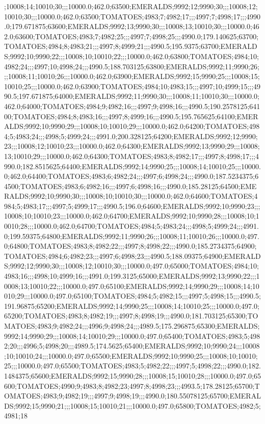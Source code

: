 ;10008;14;10010;30;;;10000.0;462.0;63500;EMERALDS;9992;12;9990;30;;;10008;12;10010;30;;;10000.0;462.0;63500;TOMATOES;4983;7;4982;17;;;4997;7;4998;17;;;4990.0;179.671875;63600;EMERALDS;9992;13;9990;30;;;10008;13;10010;30;;;10000.0;462.0;63600;TOMATOES;4983;7;4982;25;;;4997;7;4998;25;;;4990.0;179.140625;63700;TOMATOES;4984;8;4983;21;;;4997;8;4999;21;;;4990.5;195.9375;63700;EMERALDS;9992;10;9990;22;;;10008;10;10010;22;;;10000.0;462.0;63800;TOMATOES;4984;10;4982;24;;;4997;10;4998;24;;;4990.5;188.703125;63800;EMERALDS;9992;11;9990;26;;;10008;11;10010;26;;;10000.0;462.0;63900;EMERALDS;9992;15;9990;25;;;10008;15;10010;25;;;10000.0;462.0;63900;TOMATOES;4984;10;4983;15;;;4997;10;4999;15;;;4990.5;197.671875;64000;EMERALDS;9992;11;9990;30;;;10008;11;10010;30;;;10000.0;462.0;64000;TOMATOES;4984;9;4982;16;;;4997;9;4998;16;;;4990.5;190.2578125;64100;TOMATOES;4984;8;4983;16;;;4997;8;4999;16;;;4990.5;195.765625;64100;EMERALDS;9992;10;9990;29;;;10008;10;10010;29;;;10000.0;462.0;64200;TOMATOES;4984;5;4983;24;;;4998;5;4999;24;;;4991.0;200.328125;64200;EMERALDS;9992;12;9990;23;;;10008;12;10010;23;;;10000.0;462.0;64300;EMERALDS;9992;13;9990;29;;;10008;13;10010;29;;;10000.0;462.0;64300;TOMATOES;4983;8;4982;17;;;4997;8;4998;17;;;4990.0;182.8515625;64400;EMERALDS;9992;14;9990;25;;;10008;14;10010;25;;;10000.0;462.0;64400;TOMATOES;4983;6;4982;24;;;4997;6;4998;24;;;4990.0;187.5234375;64500;TOMATOES;4983;6;4982;16;;;4997;6;4998;16;;;4990.0;185.28125;64500;EMERALDS;9992;10;9990;30;;;10008;10;10010;30;;;10000.0;462.0;64600;TOMATOES;4984;5;4983;17;;;4997;5;4999;17;;;4990.5;196.0;64600;EMERALDS;9992;10;9990;23;;;10008;10;10010;23;;;10000.0;462.0;64700;EMERALDS;9992;10;9990;28;;;10008;10;10010;28;;;10000.0;462.0;64700;TOMATOES;4984;5;4983;24;;;4998;5;4999;24;;;4991.0;199.59375;64800;EMERALDS;9992;11;9990;26;;;10008;11;10010;26;;;10000.0;497.0;64800;TOMATOES;4983;8;4982;22;;;4997;8;4998;22;;;4990.0;185.2734375;64900;TOMATOES;4984;6;4982;23;;;4997;6;4998;23;;;4990.5;188.09375;64900;EMERALDS;9992;12;9990;30;;;10008;12;10010;30;;;10000.0;497.0;65000;TOMATOES;4984;10;4983;16;;;4998;10;4999;16;;;4991.0;199.3125;65000;EMERALDS;9992;13;9990;22;;;10008;13;10010;22;;;10000.0;497.0;65100;EMERALDS;9992;14;9990;29;;;10008;14;10010;29;;;10000.0;497.0;65100;TOMATOES;4984;5;4982;15;;;4997;5;4998;15;;;4990.5;191.96875;65200;EMERALDS;9992;14;9990;25;;;10008;14;10010;25;;;10000.0;497.0;65200;TOMATOES;4983;8;4982;19;;;4997;8;4998;19;;;4990.0;181.703125;65300;TOMATOES;4983;9;4982;24;;;4996;9;4998;24;;;4989.5;175.296875;65300;EMERALDS;9992;14;9990;29;;;10008;14;10010;29;;;10000.0;497.0;65400;TOMATOES;4983;5;4982;20;;;4996;5;4998;20;;;4989.5;174.5625;65400;EMERALDS;9992;10;9990;24;;;10008;10;10010;24;;;10000.0;497.0;65500;EMERALDS;9992;10;9990;25;;;10008;10;10010;25;;;10000.0;497.0;65500;TOMATOES;4983;5;4982;22;;;4997;5;4998;22;;;4990.0;182.1484375;65600;EMERALDS;9992;15;9990;28;;;10008;15;10010;28;;;10000.0;497.0;65600;TOMATOES;4990;9;4983;8;4982;23;4997;8;4998;23;;;4993.5;178.28125;65700;TOMATOES;4983;9;4982;19;;;4997;9;4998;19;;;4990.0;180.55078125;65700;EMERALDS;9992;15;9990;21;;;10008;15;10010;21;;;10000.0;497.0;65800;TOMATOES;4982;5;4981;18